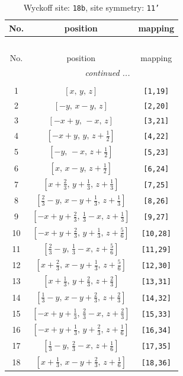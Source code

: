 \documentclass[fleqn,8pt]{jsarticle}
\begin{document}
\begin{longtable}{ccc}
\caption{Wyckoff site: {\tt 18b}, site symmetry: {\tt 11'}}
 \\
 \hline \hline
No. & position & mapping \\ \hline \endfirsthead

\multicolumn{2}{l}{\tablename\ \thetable{}} \\
 \hline \hline
No. & position & mapping \\ \hline \endhead

 \hline \hline
\multicolumn{2}{r}{\footnotesize\it continued ...} \\ \endfoot

 \hline \hline
\multicolumn{2}{r}{} \\ \endlastfoot

1 & $\left[ x,\, y,\, z \right]$ & {\tt [1,19]} \\ \hline
2 & $\left[ - y,\, x - y,\, z \right]$ & {\tt [2,20]} \\ \hline
3 & $\left[ - x + y,\, - x,\, z \right]$ & {\tt [3,21]} \\ \hline
4 & $\left[ - x + y,\, y,\, z + \frac{1}{2} \right]$ & {\tt [4,22]} \\ \hline
5 & $\left[ - y,\, - x,\, z + \frac{1}{2} \right]$ & {\tt [5,23]} \\ \hline
6 & $\left[ x,\, x - y,\, z + \frac{1}{2} \right]$ & {\tt [6,24]} \\ \hline
7 & $\left[ x + \frac{2}{3},\, y + \frac{1}{3},\, z + \frac{1}{3} \right]$ & {\tt [7,25]} \\ \hline
8 & $\left[ \frac{2}{3} - y,\, x - y + \frac{1}{3},\, z + \frac{1}{3} \right]$ & {\tt [8,26]} \\ \hline
9 & $\left[ - x + y + \frac{2}{3},\, \frac{1}{3} - x,\, z + \frac{1}{3} \right]$ & {\tt [9,27]} \\ \hline
10 & $\left[ - x + y + \frac{2}{3},\, y + \frac{1}{3},\, z + \frac{5}{6} \right]$ & {\tt [10,28]} \\ \hline
11 & $\left[ \frac{2}{3} - y,\, \frac{1}{3} - x,\, z + \frac{5}{6} \right]$ & {\tt [11,29]} \\ \hline
12 & $\left[ x + \frac{2}{3},\, x - y + \frac{1}{3},\, z + \frac{5}{6} \right]$ & {\tt [12,30]} \\ \hline
13 & $\left[ x + \frac{1}{3},\, y + \frac{2}{3},\, z + \frac{2}{3} \right]$ & {\tt [13,31]} \\ \hline
14 & $\left[ \frac{1}{3} - y,\, x - y + \frac{2}{3},\, z + \frac{2}{3} \right]$ & {\tt [14,32]} \\ \hline
15 & $\left[ - x + y + \frac{1}{3},\, \frac{2}{3} - x,\, z + \frac{2}{3} \right]$ & {\tt [15,33]} \\ \hline
16 & $\left[ - x + y + \frac{1}{3},\, y + \frac{2}{3},\, z + \frac{1}{6} \right]$ & {\tt [16,34]} \\ \hline
17 & $\left[ \frac{1}{3} - y,\, \frac{2}{3} - x,\, z + \frac{1}{6} \right]$ & {\tt [17,35]} \\ \hline
18 & $\left[ x + \frac{1}{3},\, x - y + \frac{2}{3},\, z + \frac{1}{6} \right]$ & {\tt [18,36]} \\
\end{longtable}
\end{document}
